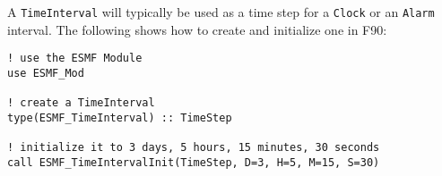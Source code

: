 
A {\tt TimeInterval} will typically be used as a time step for a {\tt Clock} 
or an {\tt Alarm} interval.  The following shows how to create and 
initialize one in F90:

\begin{verbatim}
! use the ESMF Module
use ESMF_Mod

! create a TimeInterval
type(ESMF_TimeInterval) :: TimeStep

! initialize it to 3 days, 5 hours, 15 minutes, 30 seconds
call ESMF_TimeIntervalInit(TimeStep, D=3, H=5, M=15, S=30)

\end{verbatim}



